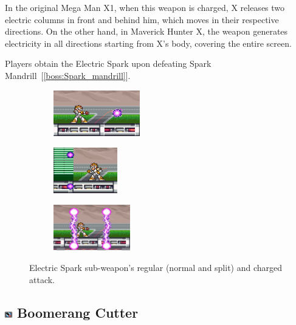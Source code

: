 In the original Mega Man X1, when this weapon is charged, X releases two electric columns in front and behind him, which moves in their respective directions. On the other hand, in Maverick Hunter X, the weapon generates electricity in all directions starting from X's body, covering the entire screen. 

Players obtain the Electric Spark upon defeating Spark Mandrill~[\ref{boss:Spark_mandrill}].

\begin{figure}[htp]
	\centering
	\begin{subfigure}{0.32\linewidth}
		\centering
		\includegraphics[height=2cm]{figures/X1/weapons/Electric_spark_1.jpg}
	\end{subfigure}
	\begin{subfigure}{0.28\linewidth}
		\centering
		\includegraphics[height=2cm]{figures/X1/weapons/Electric_spark_2.jpg}
	\end{subfigure}
	\begin{subfigure}{0.32\linewidth}
		\centering
		\includegraphics[height=2cm]{figures/X1/weapons/Electric_spark_3.jpg}
	\end{subfigure}
	\caption{Electric Spark sub-weapon's regular (normal and split) and charged attack.}
\end{figure}

\subsection{\includegraphics[width=12px, height=10px]{figures/X1/weapons/B_cutter.jpg} Boomerang Cutter}\label{Boomerang_cutter}


